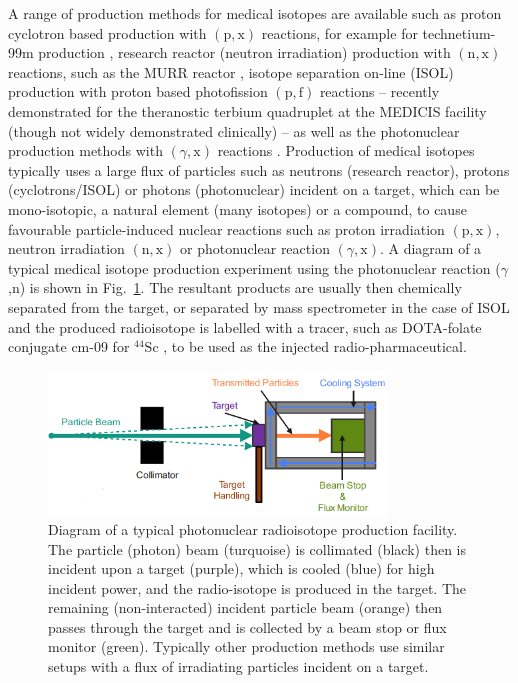 \documentclass[../main.tex]{subfiles}
\begin{document}
A range of production methods for medical isotopes are available such as proton cyclotron based production  with $\left(\mathrm{p},\mathrm{x}\right)$ reactions, for example for technetium-99m production \cite{gagnon2011cyclotron}, research reactor (neutron irradiation) production with $\left(\mathrm{n},\mathrm{x}\right)$ reactions, such as the MURR reactor \cite{ma1996production}, isotope separation on-line (ISOL) production with  proton based photofission $\left(\mathrm{p},\mathrm{f}\right)$ reactions -- recently demonstrated for the theranostic terbium quadruplet \cite{muller2012unique} at the MEDICIS facility \cite{dos2014cern} (though not widely demonstrated clinically) -- as well as the photonuclear production methods with $\left(\gamma,\mathrm{x}\right)$ reactions \cite{habs2011production}. Production of medical isotopes typically uses a large flux of particles such as neutrons (research reactor), protons (cyclotrons/ISOL) or photons (photonuclear) incident on a target, which can be mono-isotopic, a natural element (many isotopes) or a compound, to cause favourable particle-induced nuclear reactions such as proton irradiation $\left(\mathrm{p},\mathrm{x}\right)$, neutron irradiation $\left(\mathrm{n},\mathrm{x}\right)$ or photonuclear reaction $\left(\gamma,\mathrm{x}\right)$. A diagram of a typical medical isotope production experiment using the photonuclear reaction ($\gamma$,n) is shown in Fig.~\ref{fig:isotope_production_diagram}. The resultant products are usually then chemically separated from the target, or separated by mass spectrometer in the case of ISOL \cite{catherall2017isolde} and the produced radioisotope is labelled with a tracer, such as DOTA-folate conjugate cm-09 for $^{44}\mathrm{Sc}$ \cite{muller2013folate}, to be used as the injected radio-pharmaceutical.  
\begin{figure}[!h]
\centering
\includegraphics[width=0.8\textwidth]{Figures/DIANA_Inverse_Compton_Source_Design/Isotope_Production_diagram_fixed.png}
\caption{Diagram of a typical photonuclear radioisotope production facility. The particle (photon) beam (turquoise) is collimated (black) then is incident upon a target (purple), which is cooled (blue) for high incident power, and the radio-isotope is produced in the target. The remaining (non-interacted) incident particle beam (orange) then passes through the target and is collected by a beam stop or flux monitor (green). Typically other production methods use similar setups with a flux of irradiating particles incident on a target.}
\label{fig:isotope_production_diagram}
\end{figure}
\end{document}
